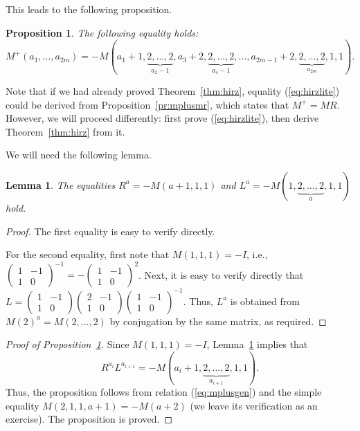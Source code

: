 \documentclass[a4paper,11pt]{amsart}
\theoremstyle{plain}
\newtheorem{prop}[theorem]{Proposition}
\newtheorem{lemma}[theorem]{Lemma}
\theoremstyle{remark}
\theoremstyle{definition}
\numberwithin{equation}{section}
\numberwithin{figure}{section}
\begin{document}
This leads to the following proposition.

\begin{prop}\label{pr:hirzlite}
The following equality holds:
\begin{equation}\label{eq:hirzlite}
M^+(a_1,\dots,a_{2m})=-M(a_1+1,\underbrace{2,\dots,2}_{a_2-1},a_3+2,\underbrace{2,\dots,2}_{a_4-1},\dots,a_{2m-1}+2,\underbrace{2,\dots,2}_{a_{2m}},1,1).
\end{equation}
\end{prop}

Note that if we had already proved Theorem~\ref{thm:hirz}, equality (\ref{eq:hirzlite}) could be derived from Proposition~\ref{pr:mplusmr}, which states that $M^+=MR$. However, we will proceed differently: first prove (\ref{eq:hirzlite}), then derive Theorem~\ref{thm:hirz} from it.

We will need the following lemma.

\begin{lemma}\label{lem:rala}
The equalities $R^a=-M(a+1,1,1)$ and $L^a=-M(1,\underbrace{2,\dots,2}_{a},1,1)$ hold.
\end{lemma}

\begin{proof}
The first equality is easy to verify directly.

For the second equality, first note that $M(1,1,1)=-I$, i.e., $\begin{pmatrix}1&-1\\1&0\end{pmatrix}^{-1}=-\begin{pmatrix}1&-1\\1&0\end{pmatrix}^2$. Next, it is easy to verify directly that $L=\begin{pmatrix}1&-1\\1&0\end{pmatrix}\begin{pmatrix}2&-1\\1&0\end{pmatrix}\begin{pmatrix}1&-1\\1&0\end{pmatrix}^{-1}$. Thus, $L^a$ is obtained from $M(2)^a=M(2,\dots,2)$ by conjugation by the same matrix, as required.
\end{proof}

\begin{proof}[Proof of Proposition~\ref{pr:hirzlite}]
Since $M(1,1,1)=-I$, Lemma~\ref{lem:rala} implies that
\[
R^{a_i}L^{a_{i+1}}=-M(a_i+1,\underbrace{2,\dots,2}_{a_{i+1}},1,1).
\]
Thus, the proposition follows from relation (\ref{eq:mplusgen}) and the simple equality $M(2,1,1,a+1)=-M(a+2)$ (we leave its verification as an exercise). The proposition is proved.
\end{proof}
\end{document}
